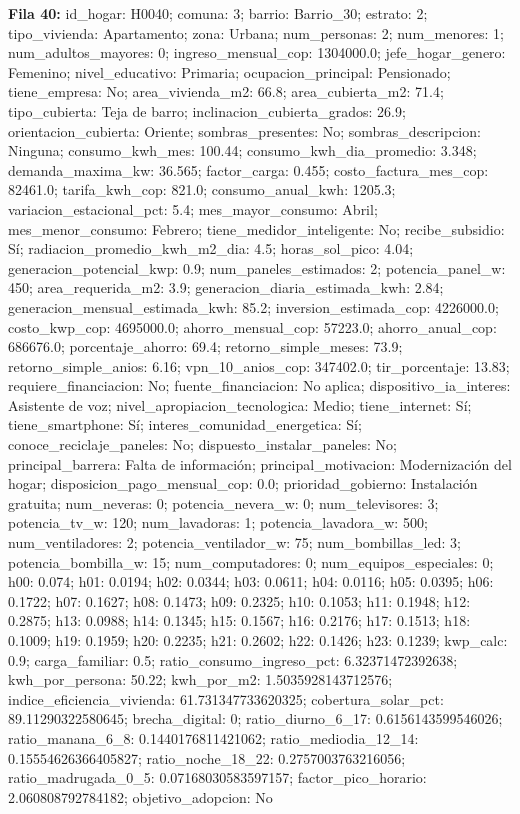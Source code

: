 {\footnotesize\textbf{Fila 40:} id\_hogar: H0040; comuna: 3; barrio: Barrio\_30; estrato: 2; tipo\_vivienda: Apartamento; zona: Urbana; num\_personas: 2; num\_menores: 1; num\_adultos\_mayores: 0; ingreso\_mensual\_cop: 1304000.0; jefe\_hogar\_genero: Femenino; nivel\_educativo: Primaria; ocupacion\_principal: Pensionado; tiene\_empresa: No; area\_vivienda\_m2: 66.8; area\_cubierta\_m2: 71.4; tipo\_cubierta: Teja de barro; inclinacion\_cubierta\_grados: 26.9; orientacion\_cubierta: Oriente; sombras\_presentes: No; sombras\_descripcion: Ninguna; consumo\_kwh\_mes: 100.44; consumo\_kwh\_dia\_promedio: 3.348; demanda\_maxima\_kw: 36.565; factor\_carga: 0.455; costo\_factura\_mes\_cop: 82461.0; tarifa\_kwh\_cop: 821.0; consumo\_anual\_kwh: 1205.3; variacion\_estacional\_pct: 5.4; mes\_mayor\_consumo: Abril; mes\_menor\_consumo: Febrero; tiene\_medidor\_inteligente: No; recibe\_subsidio: Sí; radiacion\_promedio\_kwh\_m2\_dia: 4.5; horas\_sol\_pico: 4.04; generacion\_potencial\_kwp: 0.9; num\_paneles\_estimados: 2; potencia\_panel\_w: 450; area\_requerida\_m2: 3.9; generacion\_diaria\_estimada\_kwh: 2.84; generacion\_mensual\_estimada\_kwh: 85.2; inversion\_estimada\_cop: 4226000.0; costo\_kwp\_cop: 4695000.0; ahorro\_mensual\_cop: 57223.0; ahorro\_anual\_cop: 686676.0; porcentaje\_ahorro: 69.4; retorno\_simple\_meses: 73.9; retorno\_simple\_anios: 6.16; vpn\_10\_anios\_cop: 347402.0; tir\_porcentaje: 13.83; requiere\_financiacion: No; fuente\_financiacion: No aplica; dispositivo\_ia\_interes: Asistente de voz; nivel\_apropiacion\_tecnologica: Medio; tiene\_internet: Sí; tiene\_smartphone: Sí; interes\_comunidad\_energetica: Sí; conoce\_reciclaje\_paneles: No; dispuesto\_instalar\_paneles: No; principal\_barrera: Falta de información; principal\_motivacion: Modernización del hogar; disposicion\_pago\_mensual\_cop: 0.0; prioridad\_gobierno: Instalación gratuita; num\_neveras: 0; potencia\_nevera\_w: 0; num\_televisores: 3; potencia\_tv\_w: 120; num\_lavadoras: 1; potencia\_lavadora\_w: 500; num\_ventiladores: 2; potencia\_ventilador\_w: 75; num\_bombillas\_led: 3; potencia\_bombilla\_w: 15; num\_computadores: 0; num\_equipos\_especiales: 0; h00: 0.074; h01: 0.0194; h02: 0.0344; h03: 0.0611; h04: 0.0116; h05: 0.0395; h06: 0.1722; h07: 0.1627; h08: 0.1473; h09: 0.2325; h10: 0.1053; h11: 0.1948; h12: 0.2875; h13: 0.0988; h14: 0.1345; h15: 0.1567; h16: 0.2176; h17: 0.1513; h18: 0.1009; h19: 0.1959; h20: 0.2235; h21: 0.2602; h22: 0.1426; h23: 0.1239; kwp\_calc: 0.9; carga\_familiar: 0.5; ratio\_consumo\_ingreso\_pct: 6.32371472392638; kwh\_por\_persona: 50.22; kwh\_por\_m2: 1.5035928143712576; indice\_eficiencia\_vivienda: 61.731347733620325; cobertura\_solar\_pct: 89.11290322580645; brecha\_digital: 0; ratio\_diurno\_6\_17: 0.6156143599546026; ratio\_manana\_6\_8: 0.1440176811421062; ratio\_mediodia\_12\_14: 0.15554626366405827; ratio\_noche\_18\_22: 0.2757003763216056; ratio\_madrugada\_0\_5: 0.07168030583597157; factor\_pico\_horario: 2.060808792784182; objetivo\_adopcion: No\par}
